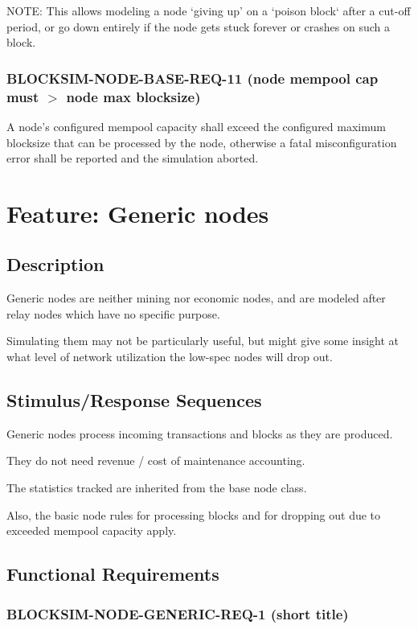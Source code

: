 \documentclass{scrreprt}
\begin{document}
NOTE: This allows modeling a node `giving up' on a `poison block` after a
cut-off period, or go down entirely if the node gets stuck forever or crashes
on such a block.


\subsubsection{BLOCKSIM-NODE-BASE-REQ-11 (node mempool cap must $>$ node max blocksize)}

A node's configured mempool capacity shall exceed the configured
maximum blocksize that can be processed by the node, otherwise a fatal
misconfiguration error shall be reported and the simulation aborted.



\section{Feature: Generic nodes}

\subsection{Description}

Generic nodes are neither mining nor economic nodes, and are modeled
after relay nodes which have no specific purpose.

Simulating them may not be particularly useful, but might give some
insight at what level of network utilization the low-spec nodes will
drop out.


\subsection{Stimulus/Response Sequences}

Generic nodes process incoming transactions and blocks as they are
produced.

They do not need revenue / cost of maintenance accounting.

The statistics tracked are inherited from the base node class.

Also, the basic node rules for processing blocks and for dropping out due to
exceeded mempool capacity apply.


\subsection{Functional Requirements}

\subsubsection{BLOCKSIM-NODE-GENERIC-REQ-1 (short title)}
\end{document}
